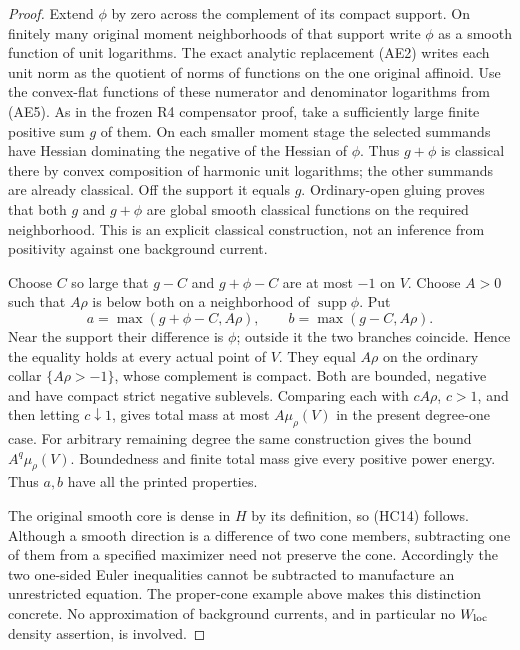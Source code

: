 \documentclass[11pt,a4paper]{article}
\numberwithin{equation}{section}
\theoremstyle{definition}
\theoremstyle{remark}
\begin{document}
\begin{proof}
Extend $\phi$ by zero across the complement of its compact
support. On finitely many original moment neighborhoods of
that support write $\phi$ as a smooth function of unit
logarithms. The exact analytic replacement (AE2) writes each
unit norm as the quotient of norms of functions on the one
original affinoid. Use the convex-flat functions of these
numerator and denominator logarithms from (AE5).
As in the frozen R4 compensator proof, take a sufficiently
large finite positive sum $g$ of them. On each smaller moment
stage the selected summands have Hessian dominating the
negative of the Hessian of $\phi$. Thus $g+\phi$ is classical
there by convex composition of harmonic unit logarithms;
the other summands are already classical. Off the support
it equals $g$. Ordinary-open gluing proves that both $g$
and $g+\phi$ are global smooth classical functions on the
required neighborhood. This is an explicit classical
construction, not an inference from positivity against one
background current.

Choose $C$ so large that $g-C$ and $g+\phi-C$ are at most
$-1$ on $V$. Choose $A>0$ such that $A\rho$ is below both
on a neighborhood of $\operatorname{supp}\phi$. Put
\[
             a=\max(g+\phi-C,A\rho),\qquad
             b=\max(g-C,A\rho).
 \tag{HC15}
\]
Near the support their difference is $\phi$; outside it the
two branches coincide. Hence the equality holds at every
actual point of $V$. They equal $A\rho$ on the ordinary
collar $\{A\rho>-1\}$, whose complement is compact.
Both are bounded, negative and have compact strict negative
sublevels. Comparing each with $cA\rho$, $c>1$, and then
letting $c\downarrow1$, gives total mass at most
$A\mu_\rho(V)$ in the present degree-one case. For arbitrary
remaining degree the same construction gives the bound
$A^q\mu_\rho(V)$. Boundedness and finite total mass give
every positive power energy. Thus $a,b$ have all the printed
properties.

The original smooth core is dense in $H$ by its definition,
so (HC14) follows. Although a smooth direction is a
difference of two cone members, subtracting one of them
from a specified maximizer need not preserve the cone.
Accordingly the two one-sided Euler inequalities cannot
be subtracted to manufacture an unrestricted equation.
The proper-cone example above makes this distinction
concrete. No approximation of background currents, and
in particular no $W_{\rm loc}$ density assertion, is involved.
\end{proof}
\end{document}
